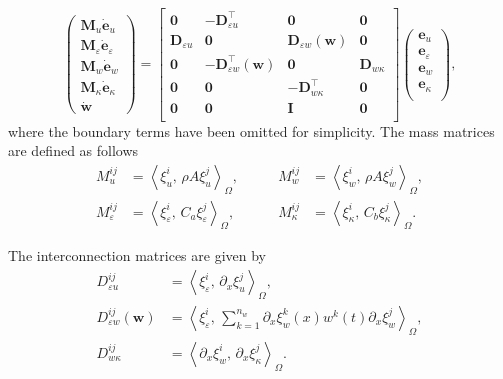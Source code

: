 \documentclass{ifacconf}
\newcommand{\inner}[3][]{\ensuremath{\left\langle #2, \, #3 \right\rangle_{#1}}}
\begin{document}
\begin{equation}\label{eq:findimSys}
\begin{pmatrix}
	\mathbf{M}_u \dot{\mathbf{e}}_u \\
	\mathbf{M}_\varepsilon \dot{\mathbf{e}}_\varepsilon \\
	\mathbf{M}_w \dot{\mathbf{e}}_w \\
	\mathbf{M}_\kappa \dot{\mathbf{e}}_\kappa \\
	 \dot{\mathbf{w}}
\end{pmatrix} = 
\begin{bmatrix}
	\mathbf{0} & -\mathbf{D}_{\varepsilon u}^\top & \mathbf{0} & \mathbf{0}  \\
	\mathbf{D}_{\varepsilon u} & \mathbf{0} & \mathbf{D}_{\varepsilon w}(\mathbf{w}) & \mathbf{0}  \\
	\mathbf{0} & -\mathbf{D}_{\varepsilon w}^\top(\mathbf{w}) & \mathbf{0} & \mathbf{D}_{w \kappa} \\
	\mathbf{0} & \mathbf{0} & -\mathbf{D}_{w \kappa}^\top & \mathbf{0}  \\
	\mathbf{0} & \mathbf{0} & \mathbf{I} & \mathbf{0} \\ 
\end{bmatrix}
\begin{pmatrix}
	\mathbf{e}_u \\
	\mathbf{e}_\varepsilon \\
	\mathbf{e}_w \\
	\mathbf{e}_\kappa \\
\end{pmatrix},
\end{equation}
where the boundary terms have been omitted for simplicity. The mass matrices are defined as follows
\begin{equation}
	\begin{aligned}
	M_u^{ij} &= \inner[\Omega]{\xi_u^i}{\rho A \xi_u^j}, \\
	M_\varepsilon^{ij} &= \inner[\Omega]{\xi_\varepsilon^i}{C_a \xi_\varepsilon^j}, 
	\end{aligned} \qquad 
	\begin{aligned}
	M_w^{ij} &= \inner[\Omega]{\xi_w^i}{\rho A \xi_w^j}, \\
	M_\kappa^{ij} &= \inner[\Omega]{\xi_\kappa^i}{C_b \xi_\kappa^j}.
	\end{aligned}
\end{equation}

The interconnection matrices are given by 
\begin{equation}
	\begin{aligned}
	D_{\varepsilon u}^{ij} &= \inner[\Omega]{\xi_\varepsilon^i}{\partial_x \xi_u^j}, \\
	D_{\varepsilon w}^{ij}(\mathbf{w}) &= \inner[\Omega]{\xi_\varepsilon^i}{ \sum_{k=1}^{n_w} \partial_x \xi_w^k(x) w^k(t) \partial_x \xi_w^j}, \\
	D_{w \kappa}^{ij} &= \inner[\Omega]{\partial_x \xi_w^i}{\partial_x \xi_\kappa^j}.
	\end{aligned}
\end{equation}
\end{document}
